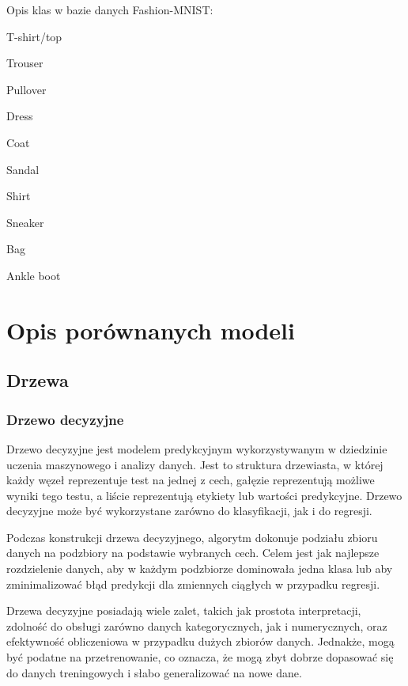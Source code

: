 \documentclass{article}
\begin{document}
Opis klas w bazie danych Fashion-MNIST:

\begin{enumerate}
    \begin{multicols}{2}
        \centering
        \setcounter{enumi}{-1}
        \item T-shirt/top
        \item Trouser
        \item Pullover
        \item Dress
        \item Coat
        \item Sandal
        \item Shirt
        \item Sneaker
        \item Bag
        \item Ankle boot
    \end{multicols}
\end{enumerate}


\section{Opis porównanych modeli}

\subsection{Drzewa}
\subsubsection{Drzewo decyzyjne}
Drzewo decyzyjne jest modelem predykcyjnym wykorzystywanym w 
dziedzinie uczenia maszynowego i analizy danych. Jest to 
struktura drzewiasta, w której każdy węzeł reprezentuje 
test na jednej z cech, gałęzie reprezentują możliwe wyniki 
tego testu, a liście reprezentują etykiety lub wartości 
predykcyjne. Drzewo decyzyjne może być wykorzystane 
zarówno do klasyfikacji, jak i do regresji.

Podczas konstrukcji drzewa decyzyjnego, 
algorytm dokonuje podziału zbioru danych 
na podzbiory na podstawie wybranych cech. 
Celem jest jak najlepsze rozdzielenie danych, 
aby w każdym podzbiorze dominowała jedna klasa 
lub aby zminimalizować błąd predykcji dla zmiennych 
ciągłych w przypadku regresji.

Drzewa decyzyjne posiadają wiele zalet, takich jak 
prostota interpretacji, zdolność do obsługi zarówno 
danych kategorycznych, jak i numerycznych, oraz efektywność 
obliczeniowa w przypadku dużych zbiorów danych. Jednakże, 
mogą być podatne na przetrenowanie, co oznacza, że mogą zbyt 
dobrze dopasować się do danych treningowych i słabo generalizować na nowe dane.
\end{document}
